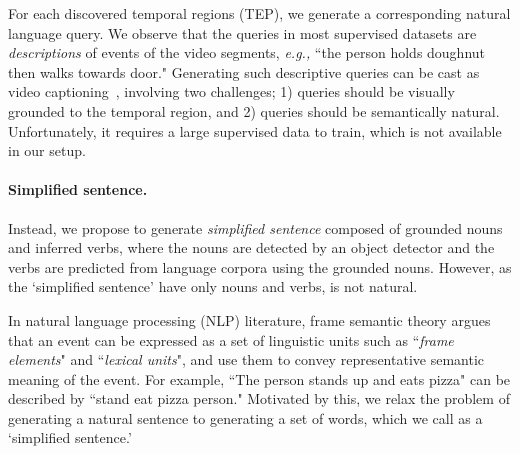 For each discovered temporal regions (TEP), we generate a corresponding natural language query.
We observe that the queries in most supervised datasets are \emph{descriptions} of events of the video segments, \emph{e.g.,} ``{the person holds doughnut then walks towards door}."
Generating such descriptive queries can be cast as video captioning~\cite{anetcap,xformercap_cvpr,streamlined_cvpr,Cornia_2020_CVPR}, involving two challenges; 1) queries should be visually grounded to the temporal region, and 2) queries should be semantically natural.
Unfortunately, it requires a large supervised data to train, which is not available in our setup.

\vspace{-1em}\paragraph{Simplified sentence.}
Instead, we propose to generate \emph{simplified sentence} composed of {grounded} nouns and {inferred} verbs, where the nouns are detected by an object detector and the verbs are predicted from language corpora using the grounded nouns.
%
However, as the `simplified sentence' have only nouns and verbs, is not natural.

In natural language processing (NLP) literature, frame semantic theory \cite{fillmore2001frame,framenet} argues that an event can be expressed as a set of linguistic units such as ``\textit{frame elements}" and ``\textit{lexical units}", and use them to convey representative semantic meaning of the event.
For example, ``{The person stands up and eats pizza}" can be described by ``{stand eat pizza person}."
Motivated by this, we relax the problem of generating a natural sentence to generating a set of words, which we call as a `simplified sentence.'

